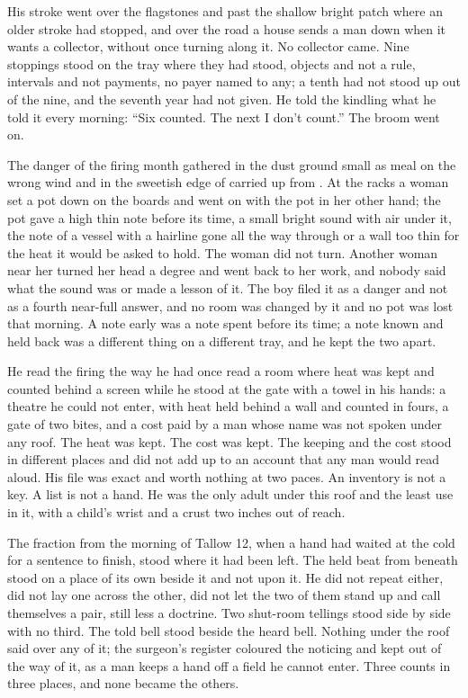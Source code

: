 His stroke went over the flagstones and past the shallow bright patch where an older stroke had stopped, and over the road a house sends a man down when it wants a collector, without once turning along it. No collector came. Nine stoppings stood on the tray where they had stood, objects and not a rule, intervals and not payments, no payer named to any; a tenth had not stood up out of the nine, and the seventh year had not given. He told the kindling what he told it every morning: “Six counted. The next I don't count.” The broom went on.

The danger of the firing month gathered in the dust ground small as meal on the wrong wind and in the sweetish edge of  carried up from . At the racks a woman set a pot down on the boards and went on with the pot in her other hand; the pot gave a high thin note before its time, a small bright sound with air under it, the note of a vessel with a hairline gone all the way through or a wall too thin for the heat it would be asked to hold. The woman did not turn. Another woman near her turned her head a degree and went back to her work, and nobody said what the sound was or made a lesson of it. The boy filed it as a danger and not as a fourth near-full answer, and no room was changed by it and no pot was lost that morning. A note early was a note spent before its time; a note known and held back was a different thing on a different tray, and he kept the two apart.

He read the firing the way he had once read a room where heat was kept and counted behind a screen while he stood at the gate with a towel in his hands: a theatre he could not enter, with heat held behind a wall and counted in fours, a gate of two bites, and a cost paid by a man whose name was not spoken under any roof. The heat was kept. The cost was kept. The keeping and the cost stood in different places and did not add up to an account that any man would read aloud. His file was exact and worth nothing at two paces. An inventory is not a key. A list is not a hand. He was the only adult under this roof and the least use in it, with a child's wrist and a crust two inches out of reach.

The fraction from the morning of Tallow 12, when a hand had waited at the cold  for a sentence to finish, stood where it had been left. The held beat from beneath  stood on a place of its own beside it and not upon it. He did not repeat either, did not lay one across the other, did not let the two of them stand up and call themselves a pair, still less a doctrine. Two shut-room tellings stood side by side with no third. The told bell stood beside the heard bell. Nothing under the roof said  over any of it; the surgeon's register coloured the noticing and kept out of the way of it, as a man keeps a hand off a field he cannot enter. Three counts in three places, and none became the others.

